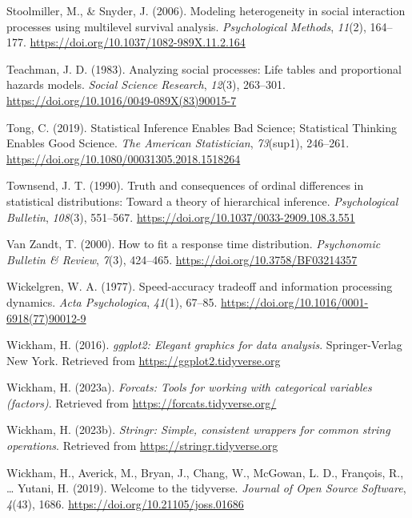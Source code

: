 \documentclass[
  man, donotrepeattitle,floatsintext]{apa6}
\newlength{\cslhangindent}
\newenvironment{CSLReferences}[2] %
 {\begin{list}{}{%
  \setlength{\itemindent}{0pt}
  \setlength{\leftmargin}{0pt}
  \setlength{\parsep}{0pt}
  \ifodd #1
   \setlength{\leftmargin}{\cslhangindent}
   \setlength{\itemindent}{-1\cslhangindent}
  \fi
  \setlength{\itemsep}{#2\baselineskip}}}
 {\end{list}}
\begin{document}
\begin{CSLReferences}{1}{0}
Stoolmiller, M., \& Snyder, J. (2006). Modeling heterogeneity in social interaction processes using multilevel survival analysis. \emph{Psychological Methods}, \emph{11}(2), 164--177. \url{https://doi.org/10.1037/1082-989X.11.2.164}

Teachman, J. D. (1983). Analyzing social processes: {Life} tables and proportional hazards models. \emph{Social Science Research}, \emph{12}(3), 263--301. \url{https://doi.org/10.1016/0049-089X(83)90015-7}

Tong, C. (2019). Statistical {Inference Enables Bad Science}; {Statistical Thinking Enables Good Science}. \emph{The American Statistician}, \emph{73}(sup1), 246--261. \url{https://doi.org/10.1080/00031305.2018.1518264}

Townsend, J. T. (1990). Truth and consequences of ordinal differences in statistical distributions: {Toward} a theory of hierarchical inference. \emph{Psychological Bulletin}, \emph{108}(3), 551--567. \url{https://doi.org/10.1037/0033-2909.108.3.551}

Van Zandt, T. (2000). How to fit a response time distribution. \emph{Psychonomic Bulletin \& Review}, \emph{7}(3), 424--465. \url{https://doi.org/10.3758/BF03214357}

Wickelgren, W. A. (1977). Speed-accuracy tradeoff and information processing dynamics. \emph{Acta Psychologica}, \emph{41}(1), 67--85. \url{https://doi.org/10.1016/0001-6918(77)90012-9}

Wickham, H. (2016). \emph{ggplot2: Elegant graphics for data analysis}. Springer-Verlag New York. Retrieved from \url{https://ggplot2.tidyverse.org}

Wickham, H. (2023a). \emph{Forcats: Tools for working with categorical variables (factors)}. Retrieved from \url{https://forcats.tidyverse.org/}

Wickham, H. (2023b). \emph{Stringr: Simple, consistent wrappers for common string operations}. Retrieved from \url{https://stringr.tidyverse.org}

Wickham, H., Averick, M., Bryan, J., Chang, W., McGowan, L. D., François, R., \ldots{} Yutani, H. (2019). Welcome to the {tidyverse}. \emph{Journal of Open Source Software}, \emph{4}(43), 1686. \url{https://doi.org/10.21105/joss.01686}


\end{CSLReferences}
\end{document}
